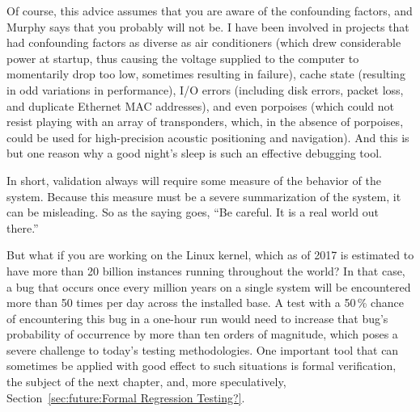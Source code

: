 Of course, this advice assumes that you are aware of the confounding
factors, and Murphy says that you probably will not be.
I have been involved in projects that had confounding factors as
diverse as air conditioners (which drew considerable power at startup,
thus causing the voltage supplied to the computer to momentarily drop
too low, sometimes resulting in failure), cache state (resulting in
odd variations in performance), I/O errors (including disk errors,
packet loss, and duplicate Ethernet MAC addresses), and even
porpoises (which could not resist playing with an array of transponders,
which, in the absence of porpoises, could be
used for high-precision acoustic positioning and navigation).
And this is but one reason why a good night's sleep is such an
effective debugging tool.

In short, validation always will require some measure of the behavior of
the system.
Because this measure must be a severe summarization of the system,
it can be misleading.
So as the saying goes, ``Be careful.  It is a real world out there.''

But what if you are working on the Linux kernel, which as of 2017 is
estimated to have more than 20 billion instances running throughout
the world?
In that case, a bug that occurs once every million years on a single system
will be encountered more than 50 times per day across the installed base.
A test with a 50\,\% chance of encountering this bug in a one-hour run
would need to increase that bug's probability of occurrence by more than
ten orders of magnitude, which poses a severe challenge to
today's testing methodologies.
One important tool that can sometimes be applied with good effect to
such situations is formal verification, the subject of the next chapter,
and, more speculatively, Section~\ref{sec:future:Formal Regression Testing?}.

